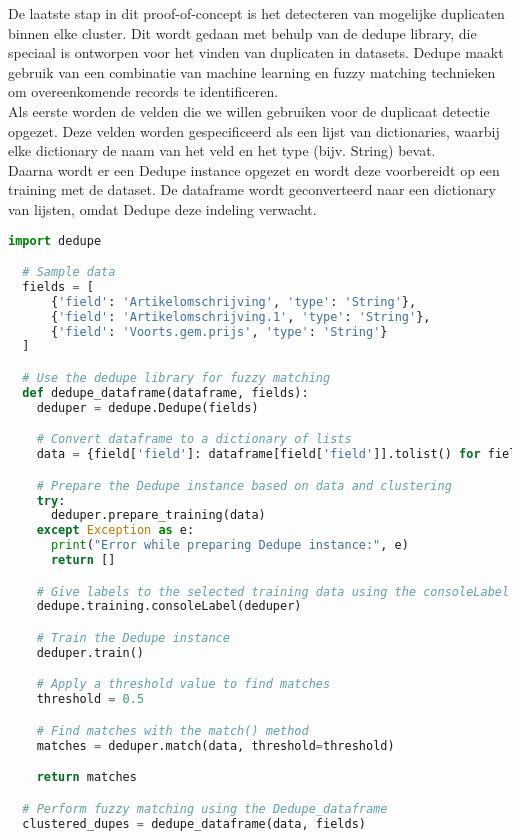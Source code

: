 De laatste stap in dit proof-of-concept is het detecteren van mogelijke duplicaten binnen elke cluster. Dit wordt gedaan met behulp van de dedupe library, die speciaal is ontworpen voor het vinden van duplicaten in datasets. Dedupe maakt gebruik van een combinatie van machine learning en fuzzy matching technieken om overeenkomende records te identificeren.
\\Als eerste worden de velden die we willen gebruiken voor de duplicaat detectie opgezet. Deze velden worden gespecificeerd als een lijst van dictionaries, waarbij elke dictionary de naam van het veld en het type (bijv. String) bevat.
\\Daarna wordt er een Dedupe instance opgezet en wordt deze voorbereidt op een training met de dataset. De dataframe wordt geconverteerd naar een dictionary van lijsten, omdat Dedupe deze indeling verwacht.
\begin{lstlisting}[language=Python, caption={Opzetten van een Dedupe instance en trainen van deze instance met de data}]
  import dedupe

  # Sample data
  fields = [
      {'field': 'Artikelomschrijving', 'type': 'String'},
      {'field': 'Artikelomschrijving.1', 'type': 'String'},
      {'field': 'Voorts.gem.prijs', 'type': 'String'}
  ]

  # Use the dedupe library for fuzzy matching
  def dedupe_dataframe(dataframe, fields):
    deduper = dedupe.Dedupe(fields)

    # Convert dataframe to a dictionary of lists
    data = {field['field']: dataframe[field['field']].tolist() for field in fields}

    # Prepare the Dedupe instance based on data and clustering
    try:
      deduper.prepare_training(data)
    except Exception as e:
      print("Error while preparing Dedupe instance:", e)
      return []

    # Give labels to the selected training data using the consoleLabel method
    dedupe.training.consoleLabel(deduper)

    # Train the Dedupe instance
    deduper.train()

    # Apply a threshold value to find matches
    threshold = 0.5

    # Find matches with the match() method
    matches = deduper.match(data, threshold=threshold)

    return matches

  # Perform fuzzy matching using the Dedupe_dataframe
  clustered_dupes = dedupe_dataframe(data, fields)
\end{lstlisting}


